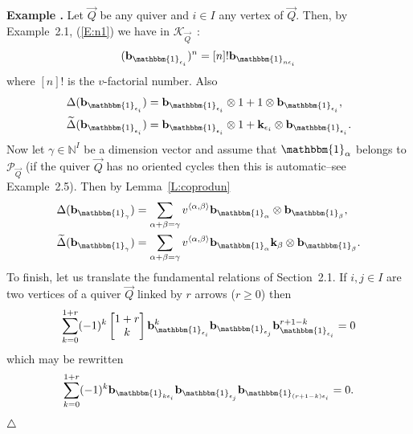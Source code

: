 \documentclass[a4paper,10pt]{amsart}
\def\endexample{$\hfill \triangle$}
\def\endexample{$\hfill \triangle$}
\def\N{\mathbb{N}}
\def\a{\alpha}
\numberwithin{equation}{section}
\begin{document}
\vspace{.2in}

\addtocounter{theo}{1}
\noindent \textbf{Example \thetheo .} Let $\vec{Q}$ be any quiver and $i \in I$ any vertex of $\vec{Q}$. Then, by Example~2.1, (\ref{E:n1}) we have in $\mathcal{K}_{\vec{Q}}$~:
\begin{equation}\label{E:n12}
(\mathbf{b}_{\mathbbm{1}_{\epsilon_i}})^n=[n]! \mathbf{b}_{\mathbbm{1}_{n\epsilon_i}}
\end{equation}
where $[n]!$ is the $v$-factorial number. Also
\begin{equation}\label{E:Deltageom}
\begin{split}
\Delta(\mathbf{b}_{\mathbbm{1}_{\epsilon_i}})&=\mathbf{b}_{\mathbbm{1}_{\epsilon_i}} \otimes 1 + 1 \otimes \mathbf{b}_{\mathbbm{1}_{\epsilon_i}},\\
\widetilde{\Delta}(\mathbf{b}_{\mathbbm{1}_{\epsilon_i}})&=\mathbf{b}_{\mathbbm{1}_{\epsilon_i}} \otimes 1 + \mathbf{k}_{\epsilon_i} \otimes \mathbf{b}_{\mathbbm{1}_{\epsilon_i}}.
\end{split}
\end{equation}
Now let $\gamma \in \N^I$ be a dimension vector and assume that $\mathbbm{1}_{\a}$ belongs to $\mathcal{P}_{\vec{Q}}$ (if the quiver $\vec{Q}$ has no oriented cycles then this is automatic--see Example~2.5). Then by Lemma~\ref{L:coprodun}
\begin{equation}\label{E:geomcorpod}
\begin{split}
\Delta(\mathbf{b}_{\mathbbm{1}_{\gamma}})&=\sum_{\a+\beta=\gamma} v^{\langle \a,\beta \rangle} \mathbf{b}_{\mathbbm{1}_{\a}} \otimes  \mathbf{b}_{\mathbbm{1}_{\beta}},\\
\widetilde{\Delta}(\mathbf{b}_{\mathbbm{1}_{\gamma}})&=\sum_{\a+\beta=\gamma} v^{\langle \a,\beta \rangle} \mathbf{b}_{\mathbbm{1}_{\a}}\mathbf{k}_{\beta} \otimes  \mathbf{b}_{\mathbbm{1}_{\beta}}.
\end{split}
\end{equation}
To finish, let us translate the fundamental relations of Section~2.1. If $i,j \in I$ are two vertices of a quiver $\vec{Q}$ linked by $r$ arrows ($r \geq 0$) then
\begin{equation}\label{E:FundRel1}
\sum_{k=0}^{1+r} (-1)^k \begin{bmatrix} 1+r \\ k \end{bmatrix} \mathbf{b}_{\mathbbm{1}_{\epsilon_i}}^k \mathbf{b}_{\mathbbm{1}_{\epsilon_j}}\mathbf{b}_{\mathbbm{1}_{\epsilon_i}}^{r+1-k}=0
\end{equation}
which may be rewritten
\begin{equation}\label{E:FundRel2}
\sum_{k=0}^{1+r} (-1)^k  \mathbf{b}_{\mathbbm{1}_{k\epsilon_i}} \mathbf{b}_{\mathbbm{1}_{\epsilon_j}}\mathbf{b}_{\mathbbm{1}_{(r+1-k)\epsilon_i}}=0.
\end{equation}
\endexample
\end{document}
